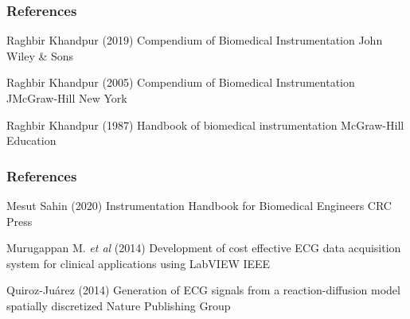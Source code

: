 \begin{frame}
\frametitle{References}
\footnotesize{
\begin{thebibliography}{99} 


 Raghbir Khandpur (2019)
\newblock Compendium of Biomedical Instrumentation
\newblock John Wiley \& Sons

 Raghbir Khandpur (2005)
\newblock Compendium of Biomedical Instrumentation
\newblock JMcGraw-Hill New York

 Raghbir Khandpur (1987)
\newblock Handbook of biomedical instrumentation
\newblock McGraw-Hill Education

\end{thebibliography}
}
\end{frame}


\begin{frame}
\frametitle{References}
\footnotesize{
\begin{thebibliography}{99} 


 Mesut Sahin (2020)
\newblock Instrumentation Handbook for Biomedical Engineers
\newblock CRC Press

 Murugappan M. \textit{et al} (2014)
\newblock Development of cost effective ECG data acquisition system for clinical applications using LabVIEW
\newblock IEEE

 Quiroz-Ju{\'a}rez (2014)
\newblock Generation of ECG signals from a reaction-diffusion model spatially discretized
\newblock Nature Publishing Group


\end{thebibliography}
}
\end{frame}



